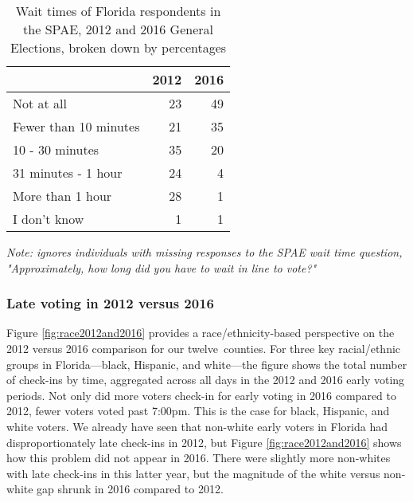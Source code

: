 \documentclass[12pt,titlepage]{article}
\newcommand{\numcounties}{twelve}
\begin{document}
\begin{table}[ht]
\centering
\caption{Wait times of Florida respondents in the SPAE, 2012 and 2016
  General Elections, broken down by percentages} 
\label{tab:floridaspae}
\begin{tabular}{lrr}
  \hline
 & 2012 & 2016 \\ 
  \hline
  Not at all &  23 &  49 \\ 
  Fewer than 10 minutes &  21 &  35 \\ 
  10 - 30 minutes &  35 &  20 \\ 
  31 minutes - 1 hour &  24 &   4 \\ 
  More than 1 hour &  28 &   1 \\ 
  I don't know &   1 &   1 \\ 
   \hline
\end{tabular}
\begin{flushleft}
  \emph{Note: ignores individuals with missing responses to the SPAE
    wait time question, "Approximately, how long did you have to wait
    in line to vote?"}
\end{flushleft}
\end{table}

% 

\subsubsection*{Late voting in 2012 versus 2016}

Figure \ref{fig:race2012and2016} provides a race/ethnicity-based
perspective on the 2012 versus 2016 comparison for our \numcounties\
counties.  For three key racial/ethnic groups in Florida---black,
Hispanic, and white---the figure shows the total number of check-ins
by time, aggregated across all days in the 2012 and 2016 early voting
periods.  Not only did more voters check-in for early voting in 2016
compared to 2012, fewer voters voted past 7:00pm. This is the case for
black, Hispanic, and white voters. We already have seen that non-white
early voters in Florida had disproportionately late check-ins in 2012,
but Figure \ref{fig:race2012and2016} shows how this problem did not
appear in 2016. There were slightly more non-whites with late
check-ins in this latter year, but the magnitude of the white versus
non-white gap shrunk in 2016 compared to 2012.
\end{document}

